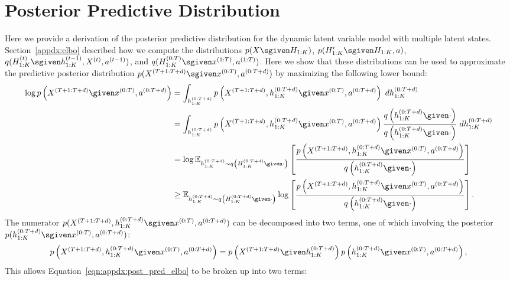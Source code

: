 \section{Posterior Predictive Distribution}
\label{appdx:posterior_predictive_distribution}
Here we provide a derivation of the posterior predictive distribution for the dynamic latent variable model with multiple latent states.
Section~\ref{appdx:elbo} described how we compute the distributions $p(X \sgiven H_{1:K})$, $p(H'_{1:K} \sgiven H_{1:K}, a)$, $q(H^{(t)}_{1:K} \sgiven h^{(t-1)}_{1:K}, X^{(t)}, a^{(t-1)})$, and $q(H_{1:K}^{(0:T)} \sgiven x^{(1:T)}, a^{(1:T)})$.
Here we show that these distributions can be used to approximate the predictive posterior distribution $p(X^{(T+1:T+d)} \sgiven x^{(0:T)}, a^{(0:T+d)})$ by maximizing the following lower bound:
\footnotesize
\begin{align}
    \log p\left(X^{(T+1:T+d)} \given x^{(0:T)}, a^{(0:T+d)}\right) &=\int_{h_{1:K}^{(0:T+d)}} p\left(X^{(T+1:T+d)}, h_{1:K}^{(0:T+d)} \given x^{(0:T)}, a^{(0:T+d)}\right) \;dh_{1:K}^{(0:T+d)}\nonumber\\
    &=\int_{h_{1:K}^{(0:T+d)}} p\left(X^{(T+1:T+d)}, h_{1:K}^{(0:T+d)} \given x^{(0:T)}, a^{(0:T+d)}\right) \frac{q\left(h_{1:K}^{(0:T+d)} \given \cdot \right)}{q\left(h_{1:K}^{(0:T+d)} \given \cdot \right)}\;dh_{1:K}^{(0:T+d)}\nonumber\\
    &=\log \mathbb{E}_{h_{1:K}^{(0:T+d)} \sim q\left(H_{1:K}^{(0:T+d)} \given \cdot \right)} \left[\frac{p\left(X^{(T+1:T+d)}, h_{1:K}^{(0:T+d)} \given x^{(0:T)}, a^{(0:T+d)}\right)}{q\left(h_{1:K}^{(0:T+d)} \given \cdot \right)}\right]\nonumber\\
    &\geq \mathbb{E}_{h_{1:K}^{(0:T+d)} \sim q\left(H_{1:K}^{(0:T+d)} \given \cdot \right)} \log \left[\frac{p\left(X^{(T+1:T+d)}, h_{1:K}^{(0:T+d)} \given x^{(0:T)}, a^{(0:T+d)}\right)}{q\left(h_{1:K}^{(0:T+d)} \given \cdot \right)}\right].\label{eqn:appdx:post_pred_elbo}
\end{align}
\normalsize
The numerator $p(X^{(T+1:T+d)}, h_{1:K}^{(0:T+d)} \sgiven x^{(0:T)}, a^{(0:T+d)})$ can be decomposed into two terms, one of which involving the posterior $p(h_{1:K}^{(0:T+d)} \sgiven x^{(0:T)}, a^{(0:T+d)})$:
\footnotesize
\begin{equation*}
    p\left(X^{(T+1:T+d)}, h_{1:K}^{(0:T+d)} \given x^{(0:T)}, a^{(0:T+d)}\right) = p\left(X^{(T+1:T+d)} \given h_{1:K}^{(0:T+d)}\right) p\left(h_{1:K}^{(0:T+d)} \given x^{(0:T)}, a^{(0:T+d)}\right),
\end{equation*}
\normalsize
This allows Equation~\ref{eqn:appdx:post_pred_elbo} to be broken up into two terms:
